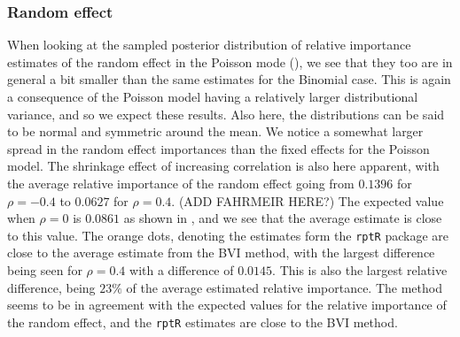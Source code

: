 \subsubsection{Random effect}
When looking at the sampled posterior distribution of relative importance estimates of the random effect in the Poisson mode (), we see that they too are in general a bit smaller than the same estimates for the Binomial case. This is again a consequence of the Poisson model having a relatively larger distributional variance, and so we expect these results. Also here, the distributions can be said to be normal and symmetric around the mean. We notice a somewhat larger spread in the random effect importances than the fixed effects for the Poisson model. The shrinkage effect of increasing correlation is also here apparent, with the average relative importance of the random effect going from $0.1396$ for $\rho=-0.4$ to $0.0627$ for $\rho=0.4$. (ADD FAHRMEIR HERE?) The expected value when $\rho=0$ is $0.0861$ as shown in , and we see that the average estimate is close to this value. The orange dots, denoting the estimates form the \texttt{rptR} package are close to the average estimate from the BVI method, with the largest difference being seen for $\rho=0.4$ with a difference of $0.0145$. This is also the largest relative difference, being $23\%$ of the average estimated relative importance. The method seems to be in agreement with the expected values for the relative importance of the random effect, and the \texttt{rptR} estimates are close to the BVI method.
